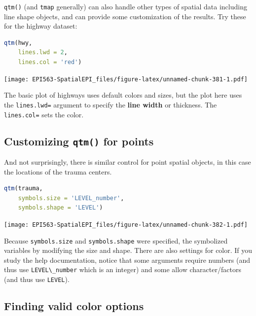 \documentclass[
]{book}
\newcommand{\passthrough}[1]{#1}
\begin{document}
\passthrough{\lstinline!qtm()!} (and \passthrough{\lstinline!tmap!} generally) can also handle other types of spatial data including line shape objects, and can provide some customization of the results. Try these for the highway dataset:

\begin{lstlisting}[language=R]
qtm(hwy, 
    lines.lwd = 2, 
    lines.col = 'red')
\end{lstlisting}

\texttt{[image: EPI563-SpatialEPI\_files/figure-latex/unnamed-chunk-381-1.pdf]}

The basic plot of highways uses default colors and sizes, but the plot here uses the \passthrough{\lstinline!lines.lwd=!} argument to specify the \textbf{line width} or thickness. The \passthrough{\lstinline!lines.col=!} sets the color.

\hypertarget{customizing-qtm-for-points}{%
\subsection{\texorpdfstring{Customizing \texttt{qtm()} for points}{Customizing qtm() for points}}\label{customizing-qtm-for-points}}

And not surprisingly, there is similar control for point spatial objects, in this case the locations of the trauma centers.

\begin{lstlisting}[language=R]
qtm(trauma,
    symbols.size = 'LEVEL_number', 
    symbols.shape = 'LEVEL')
\end{lstlisting}

\texttt{[image: EPI563-SpatialEPI\_files/figure-latex/unnamed-chunk-382-1.pdf]}

Because \passthrough{\lstinline!symbols.size!} and \passthrough{\lstinline!symbols.shape!} were specified, the symbolized variables by modifying the size and shape. There are also settings for color. If you study the help documentation, notice that some arguments require numbers (and thus use \passthrough{\lstinline!LEVEL\_number!} which is an integer) and some allow character/factors (and thus use \passthrough{\lstinline!LEVEL!}).

\hypertarget{finding-valid-color-options}{%
\subsection{Finding valid color options}\label{finding-valid-color-options}}
\end{document}
